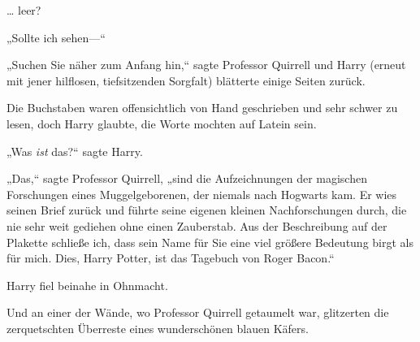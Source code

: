 … leer?

„Sollte ich sehen—“

„Suchen Sie näher zum Anfang hin,“ sagte Professor Quirrell und Harry (erneut mit jener hilflosen, tiefsitzenden Sorgfalt) blätterte einige Seiten zurück.

Die Buchstaben waren offensichtlich von Hand geschrieben und sehr schwer zu lesen, doch Harry glaubte, die Worte mochten auf Latein sein.

„Was \emph{ist} das?“ sagte Harry.

„Das,“ sagte Professor Quirrell, „sind die Aufzeichnungen der magischen Forschungen eines Muggelgeborenen, der niemals nach Hogwarts kam. Er wies seinen Brief zurück und führte seine eigenen kleinen Nachforschungen durch, die nie sehr weit gediehen ohne einen Zauberstab. Aus der Beschreibung auf der Plakette schließe ich, dass sein Name für Sie eine viel größere Bedeutung birgt als für mich. Dies, Harry Potter, ist das Tagebuch von Roger Bacon.“

Harry fiel beinahe in Ohnmacht.

Und an einer der Wände, wo Professor Quirrell getaumelt war, glitzerten die zerquetschten Überreste eines wunderschönen blauen Käfers.

